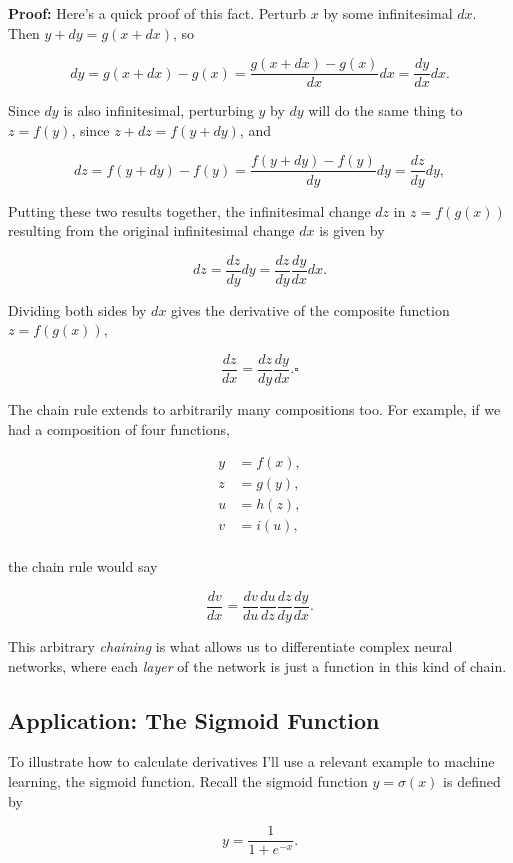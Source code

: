 \documentclass[
  letterpaper,
  DIV=11,
  numbers=noendperiod]{scrreprt}
\begin{document}
\textbf{Proof:} Here's a quick proof of this fact. Perturb \(x\) by some
infinitesimal \(dx\). Then \(y + dy = g(x + dx)\), so

\[dy = g(x+dx)-g(x) = \frac{g(x+dx)-g(x)}{dx} dx = \frac{dy}{dx} dx.\]

Since \(dy\) is also infinitesimal, perturbing \(y\) by \(dy\) will do
the same thing to \(z=f(y)\), since \(z + dz = f(y + dy)\), and

\[dz = f(y+dy)-f(y) = \frac{f(y+dy)-f(y)}{dy} dy = \frac{dz}{dy} dy,\]

Putting these two results together, the infinitesimal change \(dz\) in
\(z=f(g(x))\) resulting from the original infinitesimal change \(dx\) is
given by

\[dz = \frac{dz}{dy} dy = \frac{dz}{dy} \frac{dy}{dx} dx.\]

Dividing both sides by \(dx\) gives the derivative of the composite
function \(z=f(g(x))\),

\[\frac{dz}{dx} = \frac{dz}{dy}\frac{dy}{dx}. \square\]

The chain rule extends to arbitrarily many compositions too. For
example, if we had a composition of four functions,

\begin{align*}
y &= f(x), \\
z &= g(y), \\
u &= h(z), \\
v &= i(u), \\
\end{align*}

the chain rule would say

\[\frac{dv}{dx} = \frac{dv}{du} \frac{du}{dz} \frac{dz}{dy} \frac{dy}{dx}.\]

This arbitrary \emph{chaining} is what allows us to differentiate
complex neural networks, where each \emph{layer} of the network is just
a function in this kind of chain.

\hypertarget{application-the-sigmoid-function}{%
\subsection{Application: The Sigmoid
Function}\label{application-the-sigmoid-function}}

To illustrate how to calculate derivatives I'll use a relevant example
to machine learning, the sigmoid function. Recall the sigmoid function
\(y=\sigma(x)\) is defined by

\[y = \frac{1}{1 + e^{-x}}.\]
\end{document}
